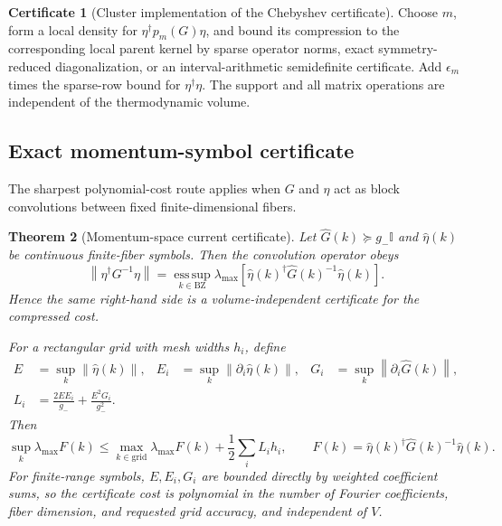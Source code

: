 \documentclass[11pt]{article}
\newtheorem{theorem}{Theorem}[section]
\theoremstyle{definition}
\newtheorem{algorithm}[theorem]{Certificate}
\theoremstyle{remark}
\newcommand{\Id}{\mathbb I}
\newcommand{\norm}[1]{\left\lVert #1\right\rVert}
\begin{document}
\begin{algorithm}[Cluster implementation of the Chebyshev certificate]
Choose $m$, form a local density for $\eta^\dagger p_m(G)\eta$, and bound its compression to the corresponding local parent kernel by sparse operator norms, exact symmetry-reduced diagonalization, or an interval-arithmetic semidefinite certificate.  Add $\epsilon_m$ times the sparse-row bound for $\eta^\dagger\eta$.  The support and all matrix operations are independent of the thermodynamic volume.
\end{algorithm}

\subsection{Exact momentum-symbol certificate}

The sharpest polynomial-cost route applies when $G$ and $\eta$ act as block convolutions between fixed finite-dimensional fibers.

\begin{theorem}[Momentum-space current certificate]
\label{thm:momentum}
Let $\widehat G(k)\succeq g_-\Id$ and $\widehat\eta(k)$ be continuous finite-fiber symbols.  Then the convolution operator obeys
\begin{equation}
 \boxed{
 \norm{\eta^\dagger G^{-1}\eta}
 =\operatorname*{ess\,sup}_{k\in\mathrm{BZ}}
 \lambda_{\max}\!\left[
 \widehat\eta(k)^\dagger\widehat G(k)^{-1}\widehat\eta(k)
 \right].}
 \label{eq:momexact}
\end{equation}
Hence the same right-hand side is a volume-independent certificate for the compressed cost.

For a rectangular grid with mesh widths $h_i$, define
\begin{align}
 E&=\sup_k\norm{\widehat\eta(k)},
 &E_i&=\sup_k\norm{\partial_i\widehat\eta(k)},
 &G_i&=\sup_k\norm{\partial_i\widehat G(k)},\\
 L_i&=\frac{2EE_i}{g_-}+\frac{E^2G_i}{g_-^2}.
 \label{eq:Lipschitzdata}
\end{align}
Then
\begin{equation}
 \boxed{
 \sup_k\lambda_{\max}F(k)
 \le\max_{k\in\mathrm{grid}}\lambda_{\max}F(k)
 +\frac12\sum_iL_ih_i,}
 \qquad
 F(k)=\widehat\eta(k)^\dagger\widehat G(k)^{-1}\widehat\eta(k).
 \label{eq:gridcert}
\end{equation}
For finite-range symbols, $E,E_i,G_i$ are bounded directly by weighted coefficient sums, so the certificate cost is polynomial in the number of Fourier coefficients, fiber dimension, and requested grid accuracy, and independent of $V$.
\end{theorem}
\end{document}
